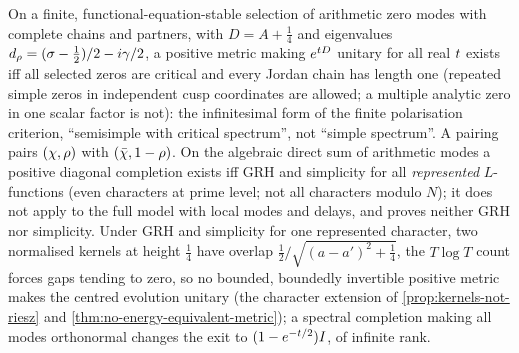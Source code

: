 \begin{proposition}
\label{prop:level-positivity-criterion}
On a finite, functional-equation-stable selection of arithmetic zero modes with complete chains and partners, with
$D = A+\tfrac14$ and eigenvalues $d_\rho = (\sigma-\tfrac12)/2-i\gamma/2$, a positive metric making $e^{t D}$ unitary for all real
$t$ exists iff all selected zeros are critical and every Jordan chain has length one (repeated simple zeros in
independent cusp coordinates are allowed; a multiple analytic zero in one scalar factor is not): the infinitesimal form
of the finite polarisation criterion, ``semisimple with critical spectrum'', not ``simple spectrum''. A pairing pairs
$(\chi,\rho)$ with $(\bar\chi,1-\rho)$. On the algebraic direct sum of arithmetic modes a positive diagonal completion
exists iff GRH and simplicity for all \emph{represented} $L$-functions (even characters at prime level; not all
characters modulo $N$); it does not apply to the full model with local modes and delays, and proves neither GRH nor
simplicity. Under GRH and simplicity for one represented character, two normalised kernels at height $\tfrac14$ have
overlap $\tfrac12/\sqrt{(a-a')^2+\tfrac14}$, the $T\log T$ count forces gaps tending to zero, so no bounded, boundedly
invertible positive metric makes the centred evolution unitary (the character extension of
\cref{prop:kernels-not-riesz} and \cref{thm:no-energy-equivalent-metric}); a spectral completion making all modes
orthonormal changes the exit to $(1-e^{-t/2})I$, of infinite rank.
\end{proposition}

